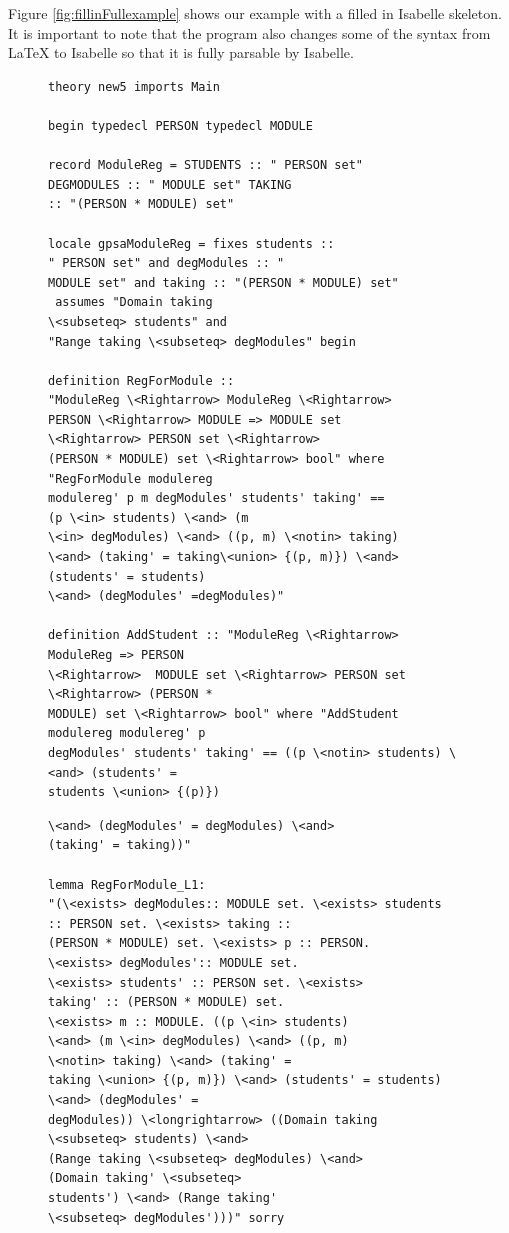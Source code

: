 Figure \ref{fig:fillinFullexample} shows our example with a filled in Isabelle
skeleton. It is important to note that the program also changes some of the
syntax from \LaTeX{} to Isabelle so that it is fully parsable by Isabelle.

\begin{figure}[H]
\centering
\begin{minipage}{0.45\textwidth}
\centering
\begin{scriptsize}
\begin{BVerbatim}
theory new5 imports Main 

begin typedecl PERSON typedecl MODULE

record ModuleReg = STUDENTS :: " PERSON set"
DEGMODULES :: " MODULE set" TAKING
:: "(PERSON * MODULE) set"

locale gpsaModuleReg = fixes students :: 
" PERSON set" and degModules :: "
MODULE set" and taking :: "(PERSON * MODULE) set"
 assumes "Domain taking
\<subseteq> students" and 
"Range taking \<subseteq> degModules" begin

definition RegForModule :: 
"ModuleReg \<Rightarrow> ModuleReg \<Rightarrow>
PERSON \<Rightarrow> MODULE => MODULE set 
\<Rightarrow> PERSON set \<Rightarrow>
(PERSON * MODULE) set \<Rightarrow> bool" where 
"RegForModule modulereg
modulereg' p m degModules' students' taking' == 
(p \<in> students) \<and> (m
\<in> degModules) \<and> ((p, m) \<notin> taking) 
\<and> (taking' = taking\<union> {(p, m)}) \<and> (students' = students) 
\<and> (degModules' =degModules)"

definition AddStudent :: "ModuleReg \<Rightarrow> 
ModuleReg => PERSON
\<Rightarrow>  MODULE set \<Rightarrow> PERSON set 
\<Rightarrow> (PERSON *
MODULE) set \<Rightarrow> bool" where "AddStudent 
modulereg modulereg' p
degModules' students' taking' == ((p \<notin> students) \<and> (students' =
students \<union> {(p)}) 
\end{BVerbatim}
\end{scriptsize}
\end{minipage}\hfill
\begin{minipage}{0.45\textwidth}
\begin{scriptsize}
\begin{BVerbatim}
\<and> (degModules' = degModules) \<and> 
(taking' = taking))"

lemma RegForModule_L1: 
"(\<exists> degModules:: MODULE set. \<exists> students
:: PERSON set. \<exists> taking :: 
(PERSON * MODULE) set. \<exists> p :: PERSON.
\<exists> degModules':: MODULE set. 
\<exists> students' :: PERSON set. \<exists>
taking' :: (PERSON * MODULE) set. 
\<exists> m :: MODULE. ((p \<in> students)
\<and> (m \<in> degModules) \<and> ((p, m) 
\<notin> taking) \<and> (taking' =
taking \<union> {(p, m)}) \<and> (students' = students) 
\<and> (degModules' =
degModules)) \<longrightarrow> ((Domain taking 
\<subseteq> students) \<and>
(Range taking \<subseteq> degModules) \<and> 
(Domain taking' \<subseteq>
students') \<and> (Range taking' 
\<subseteq> degModules')))" sorry


\end{BVerbatim}
\end{scriptsize}
\end{minipage}
\end{figure}
